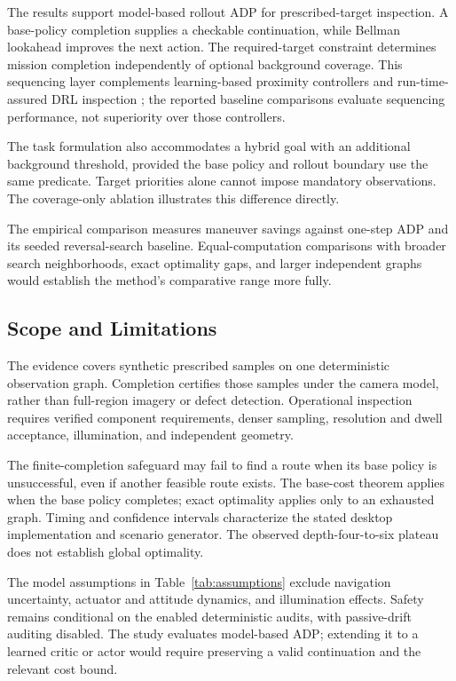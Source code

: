 The results support model-based rollout ADP for prescribed-target inspection. A base-policy completion supplies a checkable continuation, while Bellman lookahead improves the next action. The required-target constraint determines mission completion independently of optional background coverage. This sequencing layer complements learning-based proximity controllers \cite{hu2021learning,tian2024proximity} and run-time-assured DRL inspection \cite{vanwijk2024inspection}; the reported baseline comparisons evaluate sequencing performance, not superiority over those controllers.

The task formulation also accommodates a hybrid goal with an additional background threshold, provided the base policy and rollout boundary use the same predicate. Target priorities alone cannot impose mandatory observations. The coverage-only ablation illustrates this difference directly.

The empirical comparison measures maneuver savings against one-step ADP and its seeded reversal-search baseline. Equal-computation comparisons with broader search neighborhoods, exact optimality gaps, and larger independent graphs would establish the method's comparative range more fully.

\subsection{Scope and Limitations}

The evidence covers synthetic prescribed samples on one deterministic observation graph. Completion certifies those samples under the camera model, rather than full-region imagery or defect detection. Operational inspection requires verified component requirements, denser sampling, resolution and dwell acceptance, illumination, and independent geometry.

The finite-completion safeguard may fail to find a route when its base policy is unsuccessful, even if another feasible route exists. The base-cost theorem applies when the base policy completes; exact optimality applies only to an exhausted graph. Timing and confidence intervals characterize the stated desktop implementation and scenario generator. The observed depth-four-to-six plateau does not establish global optimality.

The model assumptions in Table~\ref{tab:assumptions} exclude navigation uncertainty, actuator and attitude dynamics, and illumination effects. Safety remains conditional on the enabled deterministic audits, with passive-drift auditing disabled. The study evaluates model-based ADP; extending it to a learned critic or actor would require preserving a valid continuation and the relevant cost bound.

